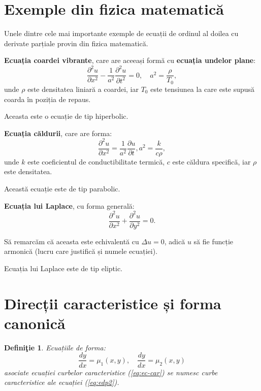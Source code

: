 \documentclass[11pt,a4paper]{article}
\theoremstyle{dotless}
\theoremstyle{dotlessdr}
\newtheorem{definition}{Defini\c{t}ie}[section]
\begin{document}

\section{Exemple din fizica matematică}

Unele dintre cele mai importante exemple de ecuații de ordinul al doilea cu
derivate parțiale provin din fizica matematică.

\textbf{Ecuația coardei vibrante}, care are aceeași formă cu \textbf{ecuația undelor plane}:
\[
  \frac{\partial^2 u}{\partial x^2} - \frac{1}{a^2} \frac{\partial^2 u}{\partial t^2} = 0, %
  \quad a^2 = \frac{\rho}{T_0},
\]
unde $ \rho $ este densitatea liniară a coardei, iar $ T_0 $ este tensiunea la care este
supusă coarda în poziția de repaus.

Aceasta este o ecuație de tip hiperbolic.

\vspace{1cm}

\textbf{Ecuația căldurii}, care are forma:
\[
  \frac{\partial^2 u}{\partial x^2} = \frac{1}{a^2} \frac{\partial u}{\partial t}, %
  a^2 = \frac{k}{c \rho},
\]
unde $ k $ este coeficientul de conductibilitate termică, $ c $ este căldura
specifică, iar $ \rho $ este densitatea.

Această ecuație este de tip parabolic.

\vspace{1cm}

\textbf{Ecuația lui Laplace}, cu forma generală:
\[
  \frac{\partial^2 u}{\partial x^2} + \frac{\partial^2 u}{\partial y^2} = 0.
\]

Să remarcăm că aceasta este echivalentă cu $ \Delta u = 0 $, adică $ u $ să fie
funcție armonică (lucru care justifică și numele ecuației).

Ecuația lui Laplace este de tip eliptic.


\section{Direcții caracteristice și forma canonică}

\begin{definition}\label{def:dir-car}
  Ecuațiile de forma:
  \begin{equation}
    \label{eq:dir-car}
    \frac{dy}{dx} = \mu_1(x, y), \quad \frac{dy}{dx} = \mu_2(x, y)
  \end{equation}
  asociate ecuației curbelor caracteristice (\ref{eq:ec-car}) se numesc
  \emph{curbe caracteristice} ale ecuației (\ref{eq:edp2}).
\end{definition}
\end{document}
